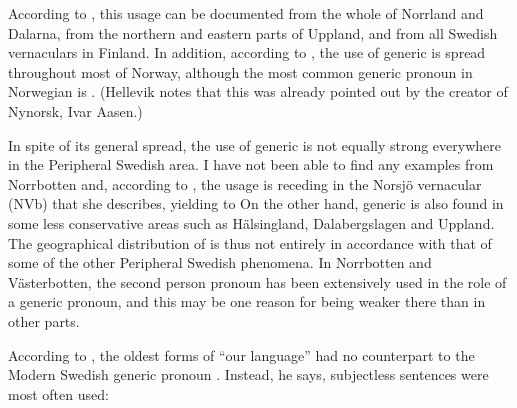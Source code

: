 According to \citet[84]{Westerberg2004}, this usage can be documented from the whole of Norrland and Dalarna, from the northern and eastern parts of Uppland, and from all Swedish vernaculars in Finland. In addition, according to \citet[48]{Hellevik1979}, the use of generic  is spread throughout most of Norway, although the most common generic pronoun in Norwegian is . (Hellevik notes that this was already pointed out by the creator of Nynorsk, Ivar Aasen.)

In spite of its general spread, the use of generic  is not equally strong everywhere in the Peripheral Swedish area. I have not been able to find any examples from Norrbotten and, according to \citet[85]{Westerberg2004}, the usage is receding in the Norsjö vernacular (NVb) that she describes, yielding to On the other hand, generic  is also found in some less conservative areas such as Hälsingland, Dalabergslagen and Uppland. The geographical distribution of  is thus not entirely in accordance with that of some of the other Peripheral Swedish phenomena. In Norrbotten and Västerbotten, the second person pronoun  has been extensively used in the role of a generic pronoun, and this may be one reason for  being weaker there than in other parts. 

According to \citealt[73]{Wessén1956}, the oldest forms of “our language” had no counterpart to the Modern Swedish generic pronoun . Instead, he says, subjectless sentences were most often used: 

\ea\label{}
\\

\z 
\z

